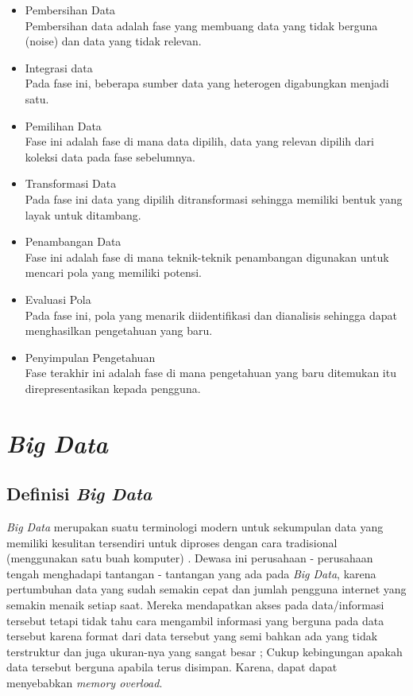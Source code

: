 \begin{itemize}
	\item{Pembersihan Data} \\
	Pembersihan data adalah fase yang membuang data yang tidak berguna (noise) dan data yang tidak relevan.
	\item{Integrasi data} \\
	Pada fase ini, beberapa sumber data yang heterogen digabungkan menjadi satu.
	\item{Pemilihan Data} \\
	Fase ini adalah fase di mana data dipilih, data yang relevan dipilih dari koleksi data pada fase sebelumnya.
	\item{Transformasi Data} \\
	Pada fase ini data yang dipilih ditransformasi sehingga memiliki bentuk yang layak untuk ditambang.
	\item{Penambangan Data} \\
	Fase ini adalah fase di mana teknik-teknik penambangan digunakan untuk mencari pola yang memiliki potensi.
	\item{Evaluasi Pola} \\
	Pada fase ini, pola yang menarik diidentifikasi dan dianalisis sehingga dapat menghasilkan pengetahuan yang baru.
	\item{Penyimpulan Pengetahuan} \\
	Fase terakhir ini adalah fase di mana pengetahuan yang baru ditemukan itu direpresentasikan kepada pengguna.
\end{itemize}

\section{{\it Big Data}}

\subsection{Definisi {\it Big Data}}
{\it Big Data} merupakan suatu terminologi modern untuk sekumpulan data yang memiliki kesulitan tersendiri untuk diproses dengan cara tradisional (menggunakan satu buah komputer) \cite{zikopoulos2011understanding}. Dewasa ini perusahaan - perusahaan tengah menghadapi tantangan - tantangan yang ada pada {\it Big Data}, karena pertumbuhan data yang sudah semakin cepat dan jumlah pengguna internet yang semakin menaik setiap saat. Mereka mendapatkan akses pada data/informasi tersebut tetapi tidak tahu cara mengambil informasi yang berguna pada data tersebut karena format dari data tersebut yang semi bahkan ada yang tidak terstruktur dan juga ukuran-nya yang sangat besar ; Cukup kebingungan apakah data tersebut berguna apabila terus disimpan. Karena, dapat dapat menyebabkan {\it memory overload}.

